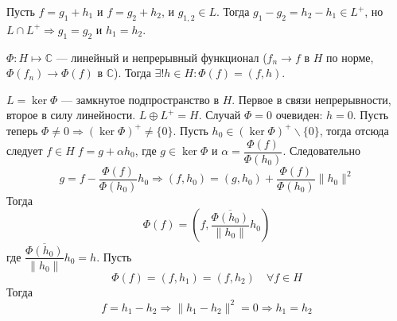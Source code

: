 \documentclass[14pt]{extarticle}
\begin{document}
Пусть $f = g_1 + h_1$ и $f = g_2 + h_2$, и $g_{1,2} \in L$.
Тогда $g_1 - g_2 = h_2 - h_1 \in L^+$, но $L \cap L^+\Rightarrow g_1 = g_2$ и $h_1 = h_2$.

\begin{Theor}
    $\Phi:H \mapsto \mathbb C$ --- линейный и непрерывный функционал ($f_n \to f$ в $H$ по норме, $\Phi(f_n) \to \Phi(f)$ в $\mathbb C$).
    Тогда $\exists! h \in H\colon \Phi(f) = (f,h)$.
\end{Theor}
\begin{Proof}
    $L = \ker \Phi$ --- замкнутое подпространство в $H$.
    Первое в связи непрерывности, второе в силу линейности.
    $L \oplus L^+ = H$.
    Случай $\Phi = 0$ очевиден: $h = 0$.
    Пусть теперь $\Phi \ne 0\Rightarrow (\ker\Phi)^+ \ne \{0\}$.
    Пусть $h_0 \in (\ker\Phi)^+\backslash\{0\}$, тогда отсюда следует $f \in H\;f = g +\alpha h_0$,
    где $g \in \ker \Phi$ и $\alpha = \dfrac{\Phi(f)}{\Phi(h_0)}$.
    Следовательно
    $$
    g = f - \dfrac{\Phi(f)}{\Phi(h_0)}h_0\Rightarrow (f,h_0) = (g, h_0) + \dfrac{\Phi(f)}{\Phi(h_0)}\|h_0\|^2
    $$
    Тогда
    $$
    \Phi(f) = (f, \dfrac{\overline{\Phi(h_0)}}{\|h_0\|}h_0)
    $$
    где $\dfrac{\overline{\Phi(h_0)}}{\|h_0\|}h_0 = h$.
    Пусть
    $$
    \Phi(f) = (f, h_1) = (f, h_2)\quad\forall f\in H
    $$
    Тогда
    $$
    f = h_1 - h_2\Rightarrow \|h_1 - h_2\|^2 = 0\Rightarrow h_1 = h_2
    $$
\end{Proof}
\end{document}
